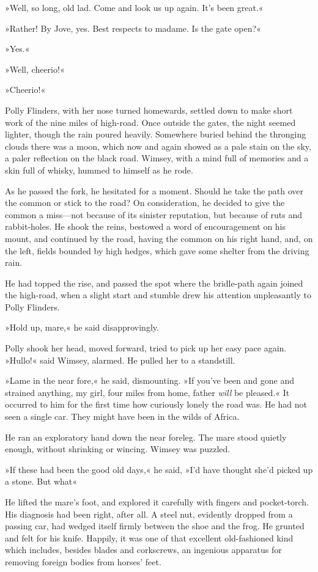 »Well, so long, old lad. Come and look us up again. It's been great.«

»Rather! By Jove, yes. Best respects to madame. Is the gate open?«

»Yes.«

»Well, cheerio!«

»Cheerio!«

Polly Flinders, with her nose turned homewards, settled down to make short work of the nine miles of high-road. Once outside the gates, the night seemed lighter, though the rain poured heavily. Somewhere buried behind the thronging clouds there was a moon, which now and again showed as a pale stain on the sky, a paler reflection on the black road. Wimsey, with a mind full of memories and a skin full of whisky, hummed to himself as he rode.

As he passed the fork, he hesitated for a moment. Should he take the path over the common or stick to the road? On consideration, he decided to give the common a miss—not because of its sinister reputation, but because of ruts and rabbit-holes. He shook the reins, bestowed a word of encouragement on his mount, and continued by the road, having the common on his right hand, and, on the left, fields bounded by high hedges, which gave some shelter from the driving rain.

He had topped the rise, and passed the spot where the bridle-path again joined the high-road, when a slight start and stumble drew his attention unpleasantly to Polly Flinders.

»Hold up, mare,« he said disapprovingly.

Polly shook her head, moved forward, tried to pick up her easy pace again. »Hullo!« said Wimsey, alarmed. He pulled her to a standstill.

»Lame in the near fore,« he said, dismounting. »If you've been and gone and strained anything, my girl, four miles from home, father \textit{will} be pleased.« It occurred to him for the first time how curiously lonely the road was. He had not seen a single car. They might have been in the wilds of Africa.

He ran an exploratory hand down the near foreleg. The mare stood quietly enough, without shrinking or wincing. Wimsey was puzzled.

»If these had been the good old days,« he said, »I'd have thought she'd picked up a stone. But what\longdash«

He lifted the mare's foot, and explored it carefully with fingers and pocket-torch. His diagnosis had been right, after all. A steel nut, evidently dropped from a passing car, had wedged itself firmly between the shoe and the frog. He grunted and felt for his knife. Happily, it was one of that excellent old-fashioned kind which includes, besides blades and corkscrews, an ingenious apparatus for removing foreign bodies from horses' feet.

